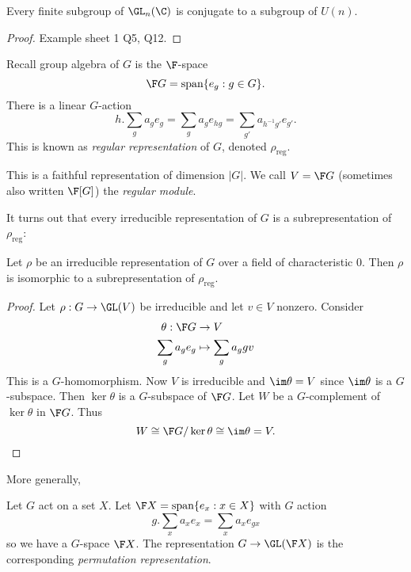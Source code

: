 \documentclass[a4paper]{article}
\begin{document}
\begin{corollary}
  Every finite subgroup of \(\GL_n(\C)\) is conjugate to a subgroup of \(U(n)\).
\end{corollary}

\begin{proof}
  Example sheet 1 Q5, Q12.
\end{proof}

\begin{definition}
  Recall group algebra of \(G\) is the \(\F\)-space
  \[
    \F G = \text{span} \{e_g: g \in G\}.
  \]
  There is a linear \(G\)-action
  \[
    h . \sum_g a_ge_g = \sum_g a_g e_{hg} = \sum_{g'} a_{h^{-1}g'} e_{g'}.
  \]
  This is known as \emph{regular representation} of \(G\), denoted \(\rho_{\text{reg}}\).
\end{definition}

This is a faithful representation of dimension \(|G|\). We call \(V = \F G\) (sometimes also written \(\F[G]\)) the \emph{regular module}.

It turns out that every irreducible representation of \(G\) is a subrepresentation of \(\rho_{\text{reg}}\):

\begin{proposition}
  Let \(\rho\) be an irreducible representation of \(G\) over a field of characteristic \(0\). Then \(\rho\) is isomorphic to a subrepresentation of \(\rho_{\text{reg}}\).
\end{proposition}

\begin{proof}
  Let \(\rho: G \to \GL(V)\) be irreducible and let \(v \in V\) nonzero. Consider
  \begin{align*}
    \theta: \F G &\to V \\
    \sum_g a_g e_g &\mapsto \sum_g a_g gv
  \end{align*}
  This is a \(G\)-homomorphism. Now \(V\) is irreducible and \(\im \theta = V\) since \(\im \theta\) is a \(G\)-subspace. Then \(\ker \theta\) is a \(G\)-subspace of \(\F G\). Let \(W\) be a \(G\)-complement of \(\ker \theta\) in \(\F G\). Thus
  \[
    W \cong \F G/ \ker \theta \cong \im \theta = V.
  \]
\end{proof}

More generally,

\begin{definition}
  Let \(G\) act on a set \(X\). Let \(\F X = \text{span}\{e_x: x \in X\}\) with \(G\) action
  \[
    g . \sum_x a_x e_x = \sum_x a_x e_{gx}
  \]
  so we have a \(G\)-space \(\F X\). The representation \(G \to \GL(\F X)\) is the corresponding \emph{permutation representation}.
\end{definition}
\end{document}
